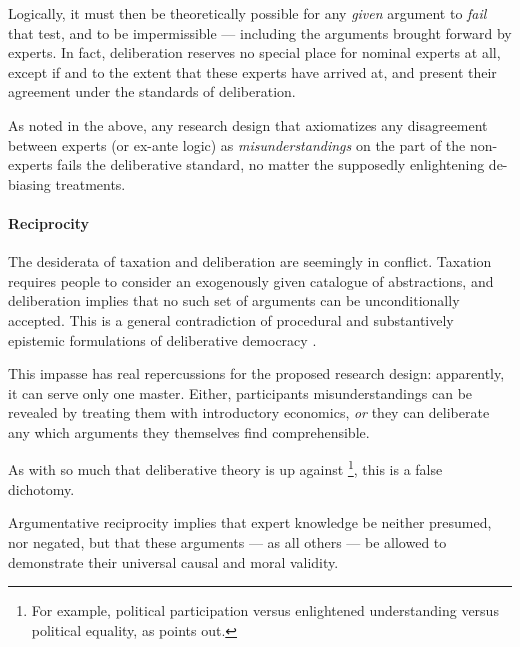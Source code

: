 Logically, it must then be theoretically possible for any \emph{given} argument to \emph{fail} that test, and to be impermissible --- including the arguments brought forward by experts.
In fact, deliberation reserves no special place for nominal experts at all, except if and to the extent that these experts have arrived at, and present their agreement under the standards of deliberation.
	
As noted in the above, any research design that axiomatizes any disagreement between experts (or ex-ante logic) as \emph{misunderstandings} on the part of the non-experts fails the deliberative standard, no matter the supposedly enlightening de-biasing treatments.

\paragraph{Reciprocity}
The desiderata of taxation and deliberation are seemingly in conflict.
Taxation requires people to consider an exogenously given catalogue of abstractions, and deliberation implies that no such set of arguments can be unconditionally accepted.
This is a general contradiction of procedural and substantively epistemic formulations of deliberative democracy \cite[402]{Bohman1998}.

This impasse has real repercussions for the proposed research design: apparently, it can serve only one master.
Either, participants misunderstandings can be revealed by treating them with introductory economics, \emph{or} they can deliberate any which arguments they themselves find comprehensible.

As with so much that deliberative theory is up against
\footnote{
	For example, political participation versus enlightened understanding versus political equality, as \citeauthor{Fishkin2009} points out.
}, %
this is a false dichotomy.

Argumentative reciprocity implies that expert knowledge be neither presumed, nor negated, but that these arguments --- as all others --- be allowed to demonstrate their universal causal and moral validity.


